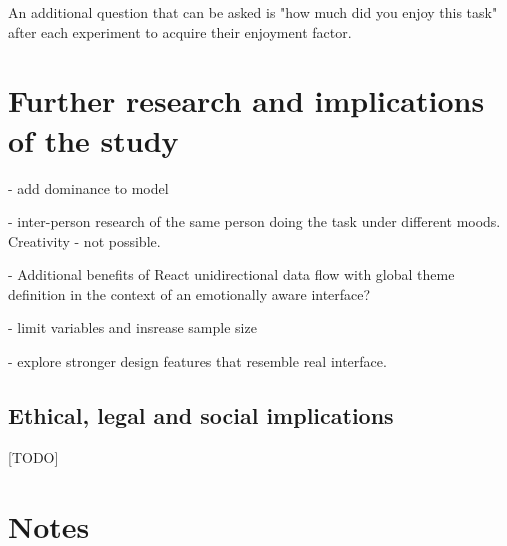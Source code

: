 	
	
	An additional question that can be asked is "how much did you enjoy this task" after each experiment to acquire their enjoyment factor.
	
	

\section{Further research and implications of the study} \label{sec:further-research}

- add dominance to model

- inter-person research of the same person doing the task under different moods. Creativity - not possible.

- Additional benefits of React unidirectional data flow with global theme definition in the context of an emotionally aware interface?

- limit variables and insrease sample size

- explore stronger design features that resemble real interface.

\subsection{Ethical, legal and social implications}

[TODO]

\section{Notes}

